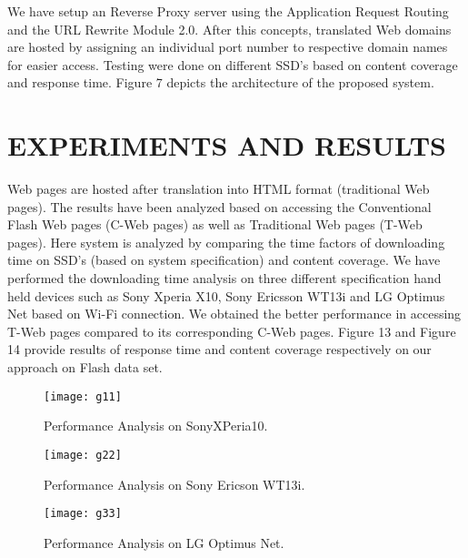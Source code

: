 \documentclass[fleqn,twoside]{article}
\begin{document}
We have setup an Reverse Proxy server using the Application Request Routing and the URL Rewrite Module 2.0. After this concepts, translated Web domains are hosted by assigning an individual port number to respective domain names for easier access. Testing were done on different SSD's based on content coverage and response time. Figure 7 depicts the architecture of the proposed system.


\section{EXPERIMENTS AND RESULTS}

Web pages are hosted after translation into HTML format (traditional Web pages). The results have been analyzed based on accessing the Conventional Flash Web pages (C-Web pages) as well as Traditional Web pages (T-Web pages). Here system is analyzed by comparing the time factors of downloading time on SSD's (based on system specification) and content coverage. We have performed the downloading time analysis on three different specification hand held devices such as Sony Xperia X10, Sony Ericsson WT13i and LG Optimus Net based on Wi-Fi connection. We obtained the better performance in accessing T-Web pages compared to its corresponding C-Web pages.  Figure 13 and Figure 14 provide results of response time and content coverage respectively on our approach on Flash data set.

\begin{figure}[ht!]
\centering
\texttt{[image: g11]}
\caption{Performance Analysis on SonyXPeria10.}
\end{figure}



\begin{figure}[ht!]
\centering
\texttt{[image: g22]}
\caption{Performance Analysis on Sony Ericson WT13i.}
\end{figure}

\begin{figure}[ht!]
\centering
\texttt{[image: g33]}
\caption{Performance Analysis on LG Optimus Net.}
\end{figure}

\vskip 2mm
\end{document}

